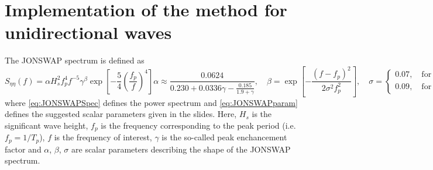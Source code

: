 \chapter{Implementation of the method for unidirectional waves}
The JONSWAP spectrum is defined as
\begin{subequations}
\begin{equation}
    S_{\eta \eta}(f) = \alpha H_s^2 f_p^4 f^{-5} \gamma^\beta \exp{\left[-\frac{5}{4}\left(\frac{f_p}{f}\right)^4\right]}
    \label{eq:JONSWAPSpec}
\end{equation} 
\begin{equation}
    \alpha \approx \frac{0.0624}{0.230+0.0336\gamma-\frac{0.185}{1.9+\gamma}} ,\quad \beta = \exp{\left[ -\frac{(f-f_p)^2}{2\sigma^2f_p^2} \right]}, \quad
    \sigma =
    \begin{cases}
    0.07, \quad \text{for }f\leq f_p \\
    0.09, \quad \text{for }f> f_p
    \end{cases}
    \label{eq:JONSWAPparam}
\end{equation}
\end{subequations}
where \cref{eq:JONSWAPSpec} defines the power spectrum and \cref{eq:JONSWAPparam} defines the suggested scalar parameters given in the slides. Here, $H_s$ is the significant wave height, $f_p$ is the frequency corresponding to the peak period (i.e. $f_p=1/T_p$), $f$ is the frequency of interest, $\gamma$ is the so-called peak enchancement factor and $\alpha$, $\beta$, $\sigma$ are scalar parameters describing the shape of the JONSWAP spectrum.

